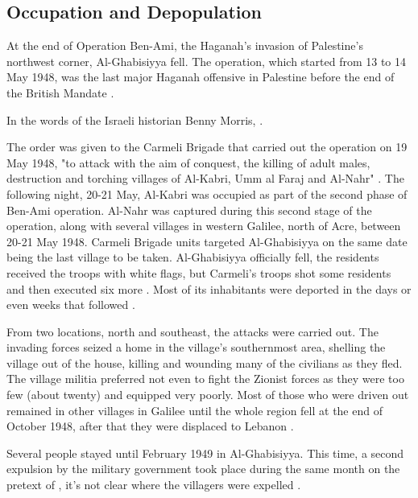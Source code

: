 \subsection{Occupation and Depopulation}

At the end of Operation Ben-Ami, the Haganah's invasion of Palestine's northwest corner, Al-Ghabisiyya fell. The operation, which started from 13 to 14 May 1948, was the last major Haganah offensive in Palestine before the end of the British Mandate \citep{Khalidi2015}.

In the words of the Israeli historian Benny Morris,  \cite[p.252]{Morris2004}.

The order was given to the Carmeli Brigade that carried out the operation on 19 May 1948, "to attack with the aim of conquest, the killing of adult males, destruction and torching villages of Al-Kabri, Umm al Faraj and Al-Nahr" \cite[p.253]{Morris2004}. The following night, 20-21 May, Al-Kabri was occupied as part of the second phase of Ben-Ami operation. Al-Nahr was captured during this second stage of the operation, along with several villages in western Galilee, north of Acre, between 20-21 May 1948. Carmeli Brigade units targeted Al-Ghabisiyya on the same date being the last village to be taken. Al-Ghabisiyya officially fell, the residents received the troops with white flags, but Carmeli's troops shot some residents and then executed six more \citep{Morris2008}. Most of its inhabitants were deported in the days or even weeks that followed \citep{Morris2004}.

From two locations, north and southeast, the attacks were carried out. The invading forces seized a home in the village's southernmost area, shelling the village out of the house, killing and wounding many of the civilians as they fled. The village militia preferred not even to fight the Zionist forces as they were too few (about twenty) and equipped very poorly. Most of those who were driven out remained in other villages in Galilee until the whole region fell at the end of October 1948, after that they were displaced to Lebanon \citep{Khalidi2015}.

Several people stayed until February 1949 in Al-Ghabisiyya. This time, a second expulsion by the military government took place during the same month on the pretext of , it's not clear where the villagers were expelled \citep{Morris2004}.

